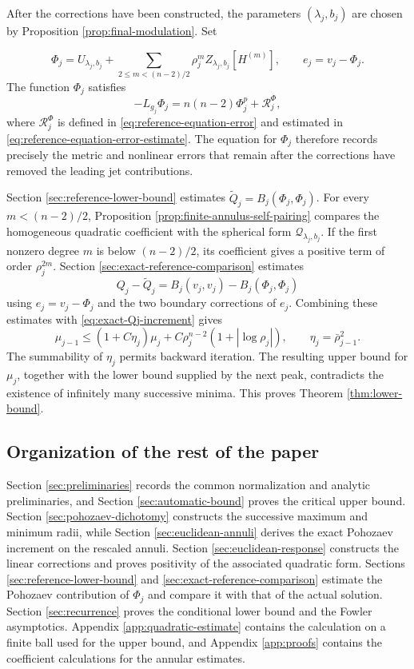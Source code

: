 \documentclass[11pt]{article}
\numberwithin{equation}{section}
\theoremstyle{remark}
\begin{document}
After the corrections have been constructed, the parameters
\((\lambda_j,b_j)\) are chosen by
Proposition  \ref{prop:final-modulation}. Set

\[
 \Phi_j=U_{\lambda_j,b_j}
 +\sum_{2\le m<(n-2)/2}\rho_j^m
 Z_{\lambda_j,b_j}[H^{(m)}],\qquad
 e_j=v_j-\Phi_j.
\]
The function \(\Phi_j\) satisfies
\[
 -L_{g_j}\Phi_j=n(n-2)\Phi_j^p+\mathcal R_j^\Phi,
\]
where \(\mathcal R_j^\Phi\) is defined in
\eqref{eq:reference-equation-error} and estimated in
\eqref{eq:reference-equation-error-estimate}. The equation for \(\Phi_j\) therefore records
precisely the metric and nonlinear errors that remain after the
corrections have removed the leading jet contributions.

Section  \ref{sec:reference-lower-bound} estimates
\(\widetilde Q_j=B_j(\Phi_j,\Phi_j)\). For every
\(m<(n-2)/2\), Proposition  \ref{prop:finite-annulus-self-pairing}
compares the homogeneous quadratic coefficient with the spherical form
\(\mathcal Q_{\lambda_j,b_j}\). If the first nonzero degree \(m\) is
below \((n-2)/2\), its coefficient gives a positive term of order
\(\rho_j^{2m}\).
Section  \ref{sec:exact-reference-comparison} estimates
\[
 Q_j-\widetilde Q_j
 =B_j(v_j,v_j)-B_j(\Phi_j,\Phi_j)
\]
using \(e_j=v_j-\Phi_j\) and the two boundary corrections of \(e_j\). Combining
these estimates with \eqref{eq:exact-Qj-increment} gives
\[
 \mu_{j-1}\le(1+C\eta_j)\mu_j
 +C\rho_j^{n-2}(1+|\log\rho_j|),
 \qquad \eta_j=\bar\rho_{j-1}^2.
\]
The summability of \(\eta_j\) permits backward iteration. The resulting
upper bound for \(\mu_j\), together with the lower bound supplied by the
next peak, contradicts the existence of infinitely many successive
minima. This proves Theorem  \ref{thm:lower-bound}.



\subsection*{Organization of the rest of the paper}

Section  \ref{sec:preliminaries} records the common normalization and
analytic preliminaries, and Section  \ref{sec:automatic-bound} proves the
critical upper bound. Section  \ref{sec:pohozaev-dichotomy} constructs the
successive maximum and minimum radii, while
Section  \ref{sec:euclidean-annuli} derives the exact Pohozaev increment on
the rescaled annuli. Section  \ref{sec:euclidean-response} constructs the
linear corrections and proves positivity of the associated quadratic
form. Sections  \ref{sec:reference-lower-bound} and
\ref{sec:exact-reference-comparison} estimate the Pohozaev contribution
of \(\Phi_j\) and compare it with that of the actual solution.
Section  \ref{sec:recurrence} proves the conditional lower bound and the
Fowler asymptotics. Appendix  \ref{app:quadratic-estimate} contains the
calculation on a finite ball used for the upper bound, and
Appendix  \ref{app:proofs} contains the coefficient calculations for the
annular estimates.
\end{document}
